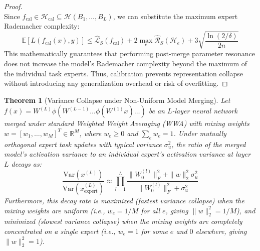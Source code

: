 \documentclass{article}
\theoremstyle{plain}
\newtheorem{theorem}{Theorem}[section]
\theoremstyle{definition}
\theoremstyle{remark}
\begin{document}
\begin{proof}
\begin{equation}
\end{equation}
Since $f_{\text{cal}} \in \mathcal{H}_{\text{cal}} \subseteq \mathcal{H}(B_1, \dots, B_L)$, we can substitute the maximum expert Rademacher complexity:
\begin{equation}
    \mathbb{E}[L(f_{\text{cal}}(x), y)] \le \widehat{\mathcal{L}}_S(f_{\text{cal}}) + 2 \max_{e} \widehat{\mathcal{R}}_S(\mathcal{H}_e) + 3 \sqrt{\frac{\ln(2/\delta)}{2n}}
\end{equation}
This mathematically guarantees that performing post-merge parameter resonance does not increase the model's Rademacher complexity beyond the maximum of the individual task experts. Thus, calibration prevents representation collapse without introducing any generalization overhead or risk of overfitting.
\end{proof}

\begin{theorem}[Variance Collapse under Non-Uniform Model Merging]
Let $f(x) = W^{(L)} \phi( W^{(L-1)} \dots \phi(W^{(1)} x) \dots )$ be an $L$-layer neural network merged under standard Weighted Weight Averaging (WWA) with mixing weights $w = [w_1, \dots, w_M]^T \in \mathbb{R}^M$, where $w_e \ge 0$ and $\sum_e w_e = 1$. Under mutually orthogonal expert task updates with typical variance $\sigma_u^2$, the ratio of the merged model's activation variance to an individual expert's activation variance at layer $L$ decays as:
\begin{equation}
    \frac{\text{Var}(x^{(L)})}{\text{Var}(x_{\text{expert}}^{(L)})} \approx \prod_{l=1}^L \frac{\|W_0^{(l)}\|_F^2 + \|w\|_2^2 \sigma_u^2}{\|W_0^{(l)}\|_F^2 + \sigma_u^2}
\end{equation}
Furthermore, this decay rate is maximized (fastest variance collapse) when the mixing weights are uniform (i.e., $w_e = 1/M$ for all $e$, giving $\|w\|_2^2 = 1/M$), and minimized (slowest variance collapse) when the mixing weights are completely concentrated on a single expert (i.e., $w_e = 1$ for some $e$ and $0$ elsewhere, giving $\|w\|_2^2 = 1$).
\end{theorem}
\end{document}

